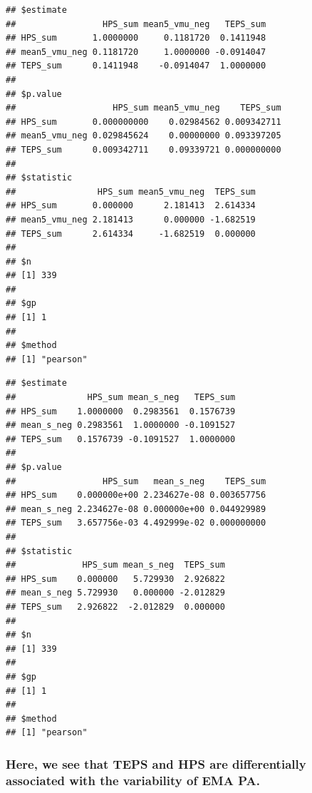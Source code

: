 \documentclass[
]{article}
\begin{document}
\begin{verbatim}
## $estimate
##                 HPS_sum mean5_vmu_neg   TEPS_sum
## HPS_sum       1.0000000     0.1181720  0.1411948
## mean5_vmu_neg 0.1181720     1.0000000 -0.0914047
## TEPS_sum      0.1411948    -0.0914047  1.0000000
## 
## $p.value
##                   HPS_sum mean5_vmu_neg    TEPS_sum
## HPS_sum       0.000000000    0.02984562 0.009342711
## mean5_vmu_neg 0.029845624    0.00000000 0.093397205
## TEPS_sum      0.009342711    0.09339721 0.000000000
## 
## $statistic
##                HPS_sum mean5_vmu_neg  TEPS_sum
## HPS_sum       0.000000      2.181413  2.614334
## mean5_vmu_neg 2.181413      0.000000 -1.682519
## TEPS_sum      2.614334     -1.682519  0.000000
## 
## $n
## [1] 339
## 
## $gp
## [1] 1
## 
## $method
## [1] "pearson"
\end{verbatim}

\begin{verbatim}
## $estimate
##              HPS_sum mean_s_neg   TEPS_sum
## HPS_sum    1.0000000  0.2983561  0.1576739
## mean_s_neg 0.2983561  1.0000000 -0.1091527
## TEPS_sum   0.1576739 -0.1091527  1.0000000
## 
## $p.value
##                 HPS_sum   mean_s_neg    TEPS_sum
## HPS_sum    0.000000e+00 2.234627e-08 0.003657756
## mean_s_neg 2.234627e-08 0.000000e+00 0.044929989
## TEPS_sum   3.657756e-03 4.492999e-02 0.000000000
## 
## $statistic
##             HPS_sum mean_s_neg  TEPS_sum
## HPS_sum    0.000000   5.729930  2.926822
## mean_s_neg 5.729930   0.000000 -2.012829
## TEPS_sum   2.926822  -2.012829  0.000000
## 
## $n
## [1] 339
## 
## $gp
## [1] 1
## 
## $method
## [1] "pearson"
\end{verbatim}

\hypertarget{here-we-see-that-teps-and-hps-are-differentially-associated-with-the-variability-of-ema-pa.}{%
\subsubsection{Here, we see that TEPS and HPS are differentially
associated with the variability of EMA
PA.}\label{here-we-see-that-teps-and-hps-are-differentially-associated-with-the-variability-of-ema-pa.}}
\end{document}
